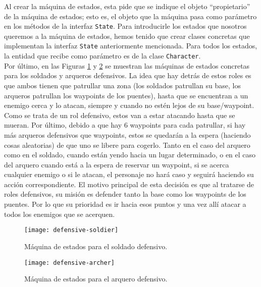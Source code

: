 Al crear la máquina de estados, esta pide que se indique el objeto ``propietario'' de la máquina de estados; esto es, el objeto que la máquina pasa como parámetro en los métodos de la interfaz \texttt{State}. Para introducirle los estados que nosotros queremos a la máquina de estados, hemos tenido que crear clases concretas que implementan la interfaz \texttt{State} anteriormente mencionada. Para todos los estados, la entidad que recibe como parámetro es de la clase \texttt{Character}. \\

Por último, en las Figuras \ref{defensivos:soldado} y \ref{defensivos:arquero} se muestran las máquinas de estados concretas para los soldados y arqueros defensivos. La idea que hay detrás de estos roles es que ambos tienen que patrullar una zona (los soldados patrullan su base, los arqueros patrullan los waypoints de los puentes), hasta que se encuentran a un enemigo cerca y lo atacan, siempre y cuando no estén lejos de su base/waypoint. Como se trata de un rol defensivo, estos van a estar atacando hasta que se mueran. Por último, debido a que hay 6 waypoints para cada patrullar, si hay más arqueros defensivos que waypoints, estos se quedarán a la espera (haciendo cosas aleatorias) de que uno se libere para cogerlo. Tanto en el caso del arquero como en el soldado, cuando están yendo hacia un lugar determinado, o en el caso del arquero cuando está a la espera de reservar un waypoint, si se acerca cualquier enemigo o si le atacan, el personaje no hará caso y seguirá haciendo su acción correspondiente. El motivo principal de esta decisión es que al tratarse de roles defensivos, su misión es defender tanto la base como los waypoints de los puentes. Por lo que su prioridad es ir hacia esos puntos y una vez allí atacar a todos los enemigos que se acerquen.
\begin{figure}[!th]
\texttt{[image: defensive-soldier]}
\centering
\caption{Máquina de estados para el soldado defensivo.}
\label{defensivos:soldado}
\end{figure}
\begin{figure}[!th]
\texttt{[image: defensive-archer]}
\centering
\caption{Máquina de estados para el arquero defensivo.}
\label{defensivos:arquero}
\end{figure}

